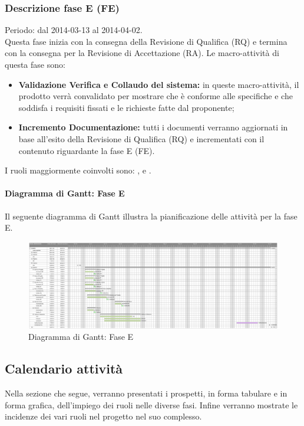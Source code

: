 \subsubsection{Descrizione fase E (FE)}
\label{Verifica e Validazione (FVV)}
Periodo: dal 2014-03-13 al 2014-04-02. \\
Questa fase inizia con la consegna della Revisione di Qualifica (RQ) e termina con la consegna per la Revisione di Accettazione (RA).
Le macro-attività di questa fase sono:
\begin{itemize}
\item \textbf{Validazione Verifica e Collaudo del sistema:} in queste macro-attività, il prodotto verrà convalidato per mostrare che è conforme alle specifiche e che soddisfa i requisiti fissati e le richieste fatte dal proponente;
\item \textbf{Incremento Documentazione:} tutti i documenti verranno aggiornati in base all'esito della Revisione di Qualifica (RQ) e incrementati con il contenuto riguardante la fase E (FE).
\end{itemize}
I ruoli maggiormente coinvolti sono: \designer , \verifier{} e \programmer.
\begin{landscape}\paragraph{Diagramma di Gantt: Fase E }
\label{DiagrammaVerificaValidazione}
Il seguente diagramma di Gantt\g{} illustra la pianificazione delle attività per la fase E.
\begin{figure}[h]
	\centering
	\includegraphics[width=1.2\textwidth]{./content/Immagini/faseE.png}
	\caption{Diagramma di Gantt: Fase E}
\end{figure}
\end{landscape}
\pagebreak
\subsection{Calendario attività}
\label{CalendarioAttività}
Nella sezione che segue, verranno presentati i prospetti, in forma tabulare e in forma grafica, dell'impiego dei ruoli nelle diverse fasi. Infine verranno mostrate le incidenze dei vari ruoli nel progetto nel suo complesso.
